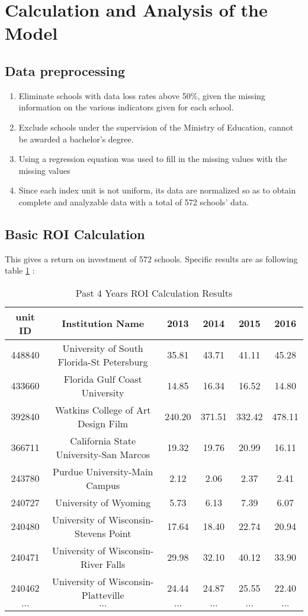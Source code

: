 \documentclass{mcmthesis}
\newcommand{\upcite}[1]{\textsuperscript{\textsuperscript{\cite{#1}}}}
\begin{document}
\section{Calculation and Analysis of the Model}

\subsection{Data preprocessing\upcite{data1,data2}}

\begin{enumerate}
	\item Eliminate schools with data loss rates above 50\%, given the missing information on the various indicators given for each school.
	\item Exclude schools under the supervision of the Ministry of Education, cannot be awarded a bachelor's degree.
	\item Using a regression equation was used to fill in the missing values with the missing values 
	\item Since each index unit is not uniform, its data are normalized so as to obtain complete and analyzable data with a total of 572 schools' data.
\end{enumerate}


\subsection{Basic ROI Calculation}

This gives a return on investment of 572 schools. Specific results are as following table \ref{tab:Past 4 Years ROI Calculation Results} :

\begin{table}[h]
\centering
\caption{Past 4 Years ROI Calculation Results}
\label{tab:Past 4 Years ROI Calculation Results}
\begin{tabular}{cccccc}
\toprule
unit ID & Institution Name & 2013 & 2014 & 2015 & 2016 \\
\midrule
448840	&University of South Florida-St Petersburg	&35.81	&43.71	&41.11	&45.28\\
433660	&Florida Gulf Coast University &	 14.85 & 16.34 & 16.52 & 14.80\\
392840	&Watkins College of Art Design  Film & 240.20	& 371.51 & 332.42 & 478.11\\
366711	&California State University-San Marcos	& 19.32	& 19.76 & 20.99 & 16.11\\
243780	&Purdue University-Main Campus &	2.12	 & 2.06	&2.37	& 2.41\\
240727	&University of Wyoming &	5.73 &	6.13 &	 7.39	& 6.07\\
240480	&University of Wisconsin-Stevens Point	&17.64	&18.40	&22.74	&20.94\\
240471	&University of Wisconsin-River Falls	 & 29.98 & 	32.10 &	40.12 &	33.90\\
240462	&University of Wisconsin-Platteville	 & 24.44 &	24.87 &	25.55 &	22.40\\
$\cdots$&$\cdots$&$\cdots$&$\cdots$&$\cdots$&$\cdots$\\
\bottomrule
\end{tabular}
\end{table}
\end{document}
